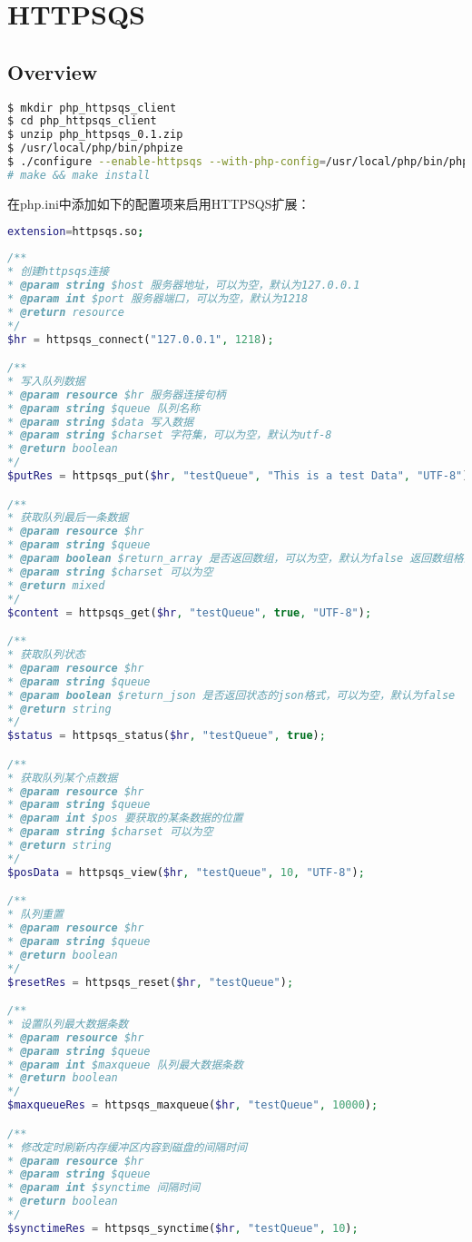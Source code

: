 \part{HTTPSQS}

\chapter{Overview}


\begin{lstlisting}[language=bash]
$ mkdir php_httpsqs_client 
$ cd php_httpsqs_client 
$ unzip php_httpsqs_0.1.zip 
$ /usr/local/php/bin/phpize 
$ ./configure --enable-httpsqs --with-php-config=/usr/local/php/bin/php-config 
# make && make install
\end{lstlisting}

在php.ini中添加如下的配置项来启用HTTPSQS扩展：

\begin{lstlisting}[language=bash]
extension=httpsqs.so;
\end{lstlisting}




\begin{lstlisting}[language=PHP]
/** 
* 创建httpsqs连接 
* @param string $host 服务器地址，可以为空，默认为127.0.0.1 
* @param int $port 服务器端口，可以为空，默认为1218 
* @return resource 
*/ 
$hr = httpsqs_connect("127.0.0.1", 1218);

/** 
* 写入队列数据 
* @param resource $hr 服务器连接句柄 
* @param string $queue 队列名称 
* @param string $data 写入数据 
* @param string $charset 字符集，可以为空，默认为utf-8 
* @return boolean 
*/ 
$putRes = httpsqs_put($hr, "testQueue", "This is a test Data", "UTF-8");

/** 
* 获取队列最后一条数据 
* @param resource $hr 
* @param string $queue 
* @param boolean $return_array 是否返回数组，可以为空，默认为false 返回数组格式：array('pos'=>'队列插入点', 'data'=>'数据值') 
* @param string $charset 可以为空 
* @return mixed 
*/ 
$content = httpsqs_get($hr, "testQueue", true, "UTF-8");

/** 
* 获取队列状态 
* @param resource $hr 
* @param string $queue 
* @param boolean $return_json 是否返回状态的json格式，可以为空，默认为false 
* @return string 
*/ 
$status = httpsqs_status($hr, "testQueue", true);

/** 
* 获取队列某个点数据 
* @param resource $hr 
* @param string $queue 
* @param int $pos 要获取的某条数据的位置 
* @param string $charset 可以为空 
* @return string 
*/ 
$posData = httpsqs_view($hr, "testQueue", 10, "UTF-8");

/** 
* 队列重置 
* @param resource $hr 
* @param string $queue 
* @return boolean 
*/ 
$resetRes = httpsqs_reset($hr, "testQueue");

/** 
* 设置队列最大数据条数 
* @param resource $hr 
* @param string $queue 
* @param int $maxqueue 队列最大数据条数 
* @return boolean 
*/ 
$maxqueueRes = httpsqs_maxqueue($hr, "testQueue", 10000);

/** 
* 修改定时刷新内存缓冲区内容到磁盘的间隔时间 
* @param resource $hr 
* @param string $queue 
* @param int $synctime 间隔时间 
* @return boolean 
*/ 
$synctimeRes = httpsqs_synctime($hr, "testQueue", 10);
\end{lstlisting}

